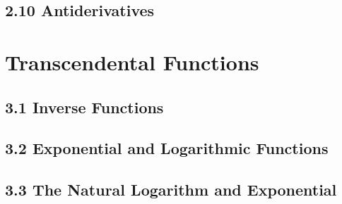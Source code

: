 \documentclass[12pt]{memoir}
\begin{document}
    \section*{2.10 Antiderivatives}
    

\chapter*{Transcendental Functions}
    \section*{3.1 Inverse Functions}
    
    \section*{3.2 Exponential and Logarithmic Functions}
    
    \section*{3.3 The Natural Logarithm and Exponential}
    
\end{document}
